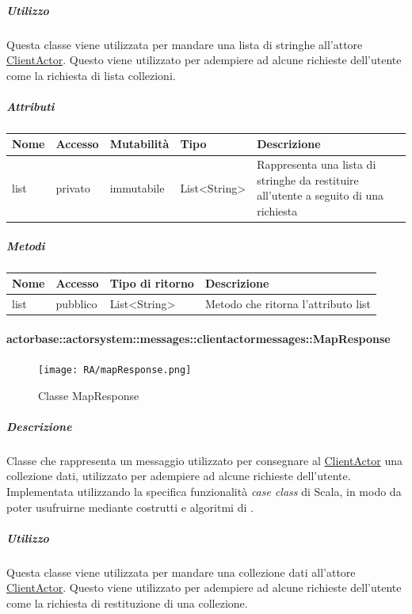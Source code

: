 \documentclass{scalatekids-article}
\begin{document}
\subparagraph{Utilizzo}
Questa classe viene utilizzata per mandare una lista di stringhe all'attore
\hyperref[sec:actorbase::actorsystem::actors::clientactor::ClientActor]{ClientActor}.
Questo viene utilizzato per adempiere ad alcune richieste dell'utente come
la richiesta di lista collezioni.

\subparagraph{Attributi}
\begin{tabular}{| p{2cm} | p{1.5cm} | p{2cm} | p{3cm} | p{8.5cm} |}
  \hline
  Nome & Accesso & Mutabilità & Tipo & Descrizione\\
  \hline
  list & privato & immutabile & List<String> & Rappresenta una lista di stringhe da restituire all'utente a seguito di una richiesta \\
  \hline
\end{tabular}

\subparagraph{Metodi}
\begin{tabular}{| p{3cm} | p{1.5cm} | p{3.5cm} | p{9cm} |}
  \hline
  Nome & Accesso & Tipo di ritorno & Descrizione\\
  \hline
  list & pubblico & List<String> & Metodo che ritorna l'attributo list\\
  \hline
\end{tabular}

\paragraph{actorbase::actorsystem::messages::clientactormessages::MapResponse}
\label{sec:actorbase::actorsystem::messages::clientactormessages::MapResponse}

\begin{figure}[H]
  \begin{center}
    \texttt{[image: RA/mapResponse.png]}
    \caption{Classe MapResponse}
  \end{center}
\end{figure}

\subparagraph{Descrizione}
Classe che rappresenta un messaggio utilizzato per consegnare al
\hyperref[sec:actorbase::actorsystem::actors::clientactor::ClientActor]{ClientActor} una collezione dati, utilizzato per adempiere ad alcune
richieste dell'utente.\\Implementata utilizzando la specifica funzionalità \textit{case class} di Scala,
in modo da poter usufruirne mediante costrutti e algoritmi di
.

\subparagraph{Utilizzo}
Questa classe viene utilizzata per mandare una collezione dati all'attore
\hyperref[sec:actorbase::actorsystem::actors::clientactor::ClientActor]{ClientActor}.
Questo viene utilizzato per adempiere ad alcune richieste dell'utente come
la richiesta di restituzione di una collezione.
\end{document}
